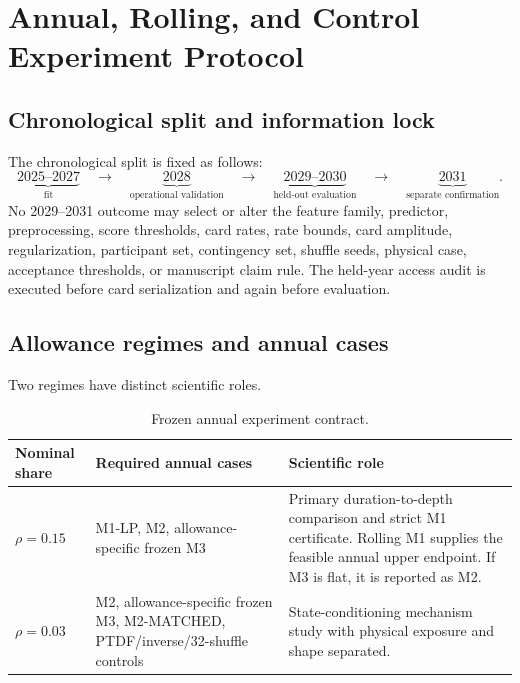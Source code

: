 \documentclass[10pt,journal,onecolumn]{IEEEtran}
\begin{document}
\section{Annual, Rolling, and Control Experiment Protocol}
\label{sec:report_experiments}

\subsection{Chronological split and information lock}

The chronological split is fixed as follows:
\begin{equation}
\underbrace{2025\text{--}2027}_{\text{fit}}
\quad\longrightarrow\quad
\underbrace{2028}_{\text{operational validation}}
\quad\longrightarrow\quad
\underbrace{2029\text{--}2030}_{\text{held-out evaluation}}
\quad\longrightarrow\quad
\underbrace{2031}_{\text{separate confirmation}}.
\label{eq:report_split}
\end{equation}
No 2029--2031 outcome may select or alter the feature family, predictor,
preprocessing, score thresholds, card rates, rate bounds, card amplitude,
regularization, participant set, contingency set, shuffle seeds, physical
case, acceptance thresholds, or manuscript claim rule. The held-year access
audit is executed before card serialization and again before evaluation.

\subsection{Allowance regimes and annual cases}

Two regimes have distinct scientific roles.

\begin{table}[t]
\centering
\caption{Frozen annual experiment contract.}
\label{tab:annual_contract}
\begin{tabularx}{\textwidth}{@{}p{}p{}X@{}}
\toprule
Nominal share & Required annual cases & Scientific role \\
\midrule
$\rho=0.15$
& M1-LP, M2, allowance-specific frozen M3
& Primary duration-to-depth comparison and strict M1 certificate. Rolling M1
supplies the feasible annual upper endpoint. If M3 is flat, it is reported as
M2. \\
$\rho=0.03$
& M2, allowance-specific frozen M3, M2-MATCHED, PTDF/inverse/32-shuffle controls
& State-conditioning mechanism study with physical exposure and shape separated.
\\
\bottomrule
\end{tabularx}
\end{table}
\end{document}
